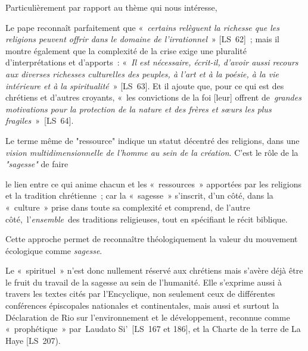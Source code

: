 Particulièrement par rapport au thème qui nous intéresse, 
\begin{singlequote}
    Le pape reconnaît parfaitement que « \textit{certains relèguent la richesse que les religions peuvent offrir dans le domaine de l’irrationnel} » [LS 62] ; mais il montre également que la complexité de la crise exige une pluralité d’interprétations et d’apports : « \textit{Il est nécessaire, écrit-il, d’avoir aussi recours aux diverses richesses culturelles des peuples, à l’art et à la poésie, à la vie intérieure et à la spiritualité} » [LS 63]. Et il ajoute que, pour ce qui est des chrétiens et d’autres croyants, « {les convictions de la foi [leur] offrent de \textit{grandes motivations pour la protection de la nature et des frères et sœurs les plus fragiles }}» [LS 64]. \cite[par. 33]{theobald_lenseignement_2016}
\end{singlequote}
Le terme même de "ressource" indique un statut décentré des religions, dans une \textit{vision multidimensionnelle de l'homme au sein de la création}. C'est le rôle de la \textit{"sagesse"} de faire
\begin{singlequote}
    [\ldots] le lien entre ce qui anime chacun et les « ressources » apportées par les religions et la tradition chrétienne ; car la « sagesse » s’inscrit, d’un côté, dans la « culture » prise dans toute sa complexité et comprend, de l’autre côté, l’\textit{ensemble} des traditions religieuses, tout en spécifiant le récit biblique.\cite[par. 34]{theobald_lenseignement_2016}
\end{singlequote}
Cette approche permet de reconnaître théologiquement la valeur du mouvement écologique comme \textit{sagesse}.
\begin{singlequote}
     Le « spirituel » n’est donc nullement réservé aux chrétiens mais s’avère déjà être le fruit du travail de la sagesse au sein de l’humanité. Elle s’exprime aussi à travers les textes cités par l’Encyclique, non seulement ceux de différentes conférences épiscopales nationales et continentales, mais aussi et surtout la Déclaration de Rio sur l’environnement et le développement, reconnue comme « prophétique » par Laudato Si’ [LS 167 et 186], et la Charte de la terre de La Haye [LS 207).\cite[par. 35]{theobald_lenseignement_2016}
\end{singlequote}

